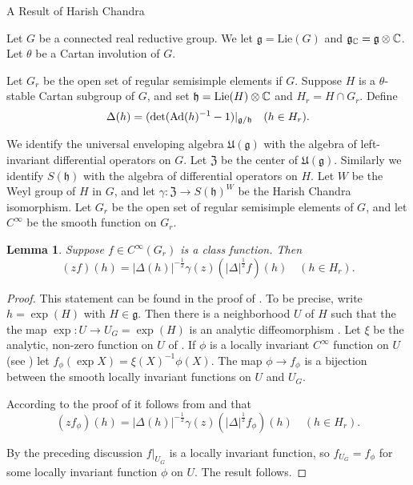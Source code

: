 \documentclass{article}
\newtheorem{lem}[thm]{Lemma}
\theoremstyle{definition}
\numberwithin{equation}{section}
\renewcommand{\-}{\hyp{}}
\newcommand{\inv}{^{-1}}
\newcommand{\z}{\mathfrak Z}
\newcommand{\g}{\mathfrak g}
\newcommand{\h}{\mathfrak h}
\begin{document}
\begin{mytitle} A Result of Harish Chandra\end{mytitle}


Let $G$ be a connected real reductive group.
We let $\g=\mathrm{Lie}(G)$ and $\g_\C=\g\otimes\C$.
Let $\theta$ be a Cartan involution of $G$.

Let $G_r$ be the open set of regular semisimple elements if $G$. Suppose $H$ is a $\theta$-stable Cartan subgroup of $G$, and set $\h=\mathrm{Lie}(H)\otimes\C$ and 
$H_r=H\cap G_r$.
Define
$$
\Delta(h)=(\det(\Ad(h)\inv -1)|_{\g/\h}\quad (h\in H_r).
$$

We identify the universal enveloping algebra $\mathfrak U(\g)$ with the algebra of left-invariant differential operators on $G$. 
Let $\z$ be the center of  $\mathfrak U(\g)$.
Similarly we identify $S(\h)$ with the algebra of differential operators on $H$. Let $W$ be the Weyl group of $H$ in $G$, and 
let $\gamma:\z\rightarrow S(\h)^W$ be the Harish Chandra isomorphism.
Let $G_r$ be the open set of regular semisimple elements of $G$, and let $C^\infty$ be the smooth function on $G_r$. 

\begin{lem}
Suppose $f\in C^\infty(G_r)$ is a class function. Then
$$
(zf)(h)=|\Delta(h)|^{-\frac12}\gamma(z)(|\Delta|^{\frac12}f)(h)\quad (h\in H_r).
$$
\end{lem}

\begin{proof}
This statement can be found in the proof of \cite[Lemma 24]{HC1}. To be precise, write $h=\exp(H)$ with $H\in \g$.
Then there is a neighborhood $U$ of $H$ such that the the map $\exp:U\rightarrow U_G=\exp(H)$ is an analytic diffeomorphism
\cite[Section 10]{HC1}. Let $\xi$ be the analytic, non-zero function on $U$ of \cite[Section 10]{HC1}. 
If $\phi$ is a locally invariant $C^\infty$ function on $U$ (see \cite[Section 8]{HC3}) let $f_\phi(\exp X)=\xi(X)\inv \phi(X)$.
The map $\phi\rightarrow f_\phi$ is a bijection between the smooth locally invariant functions on $U$ and $U_G$.

According to the proof of \cite[Lemma 24]{HC1} it follows from 
\cite[Lemma 17]{HC1} and \cite[Theorem 2]{HC2} that
\begin{equation}
\label{1}
(zf_\phi)(h)=|\Delta(h)|^{-\frac12}\gamma(z)(|\Delta|^{\frac12}f_\phi)(h)\quad (h\in H_r).
\end{equation}

By the preceding discussion $f|_{U_G}$ is a locally invariant function, so $f_{U_G}=f_\phi$ for some locally invariant
function $\phi$ on $U$. The result follows.
\end{proof}
\end{document}
